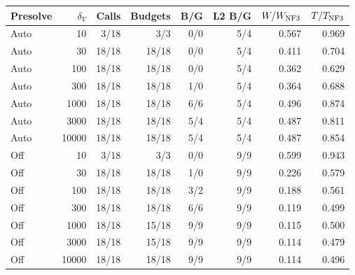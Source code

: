 \begin{tabular}{lrrrrrrr}
\toprule
Presolve & $\delta_V$ & Calls & Budgets & B/G & L2 B/G & $W/W_{\rm NF3}$ & $T/T_{\rm NF3}$\\
\midrule
Auto & 10 & 3/18 & 3/3 & 0/0 & 5/4 & 0.567 & 0.969\\
Auto & 30 & 18/18 & 18/18 & 0/0 & 5/4 & 0.411 & 0.704\\
Auto & 100 & 18/18 & 18/18 & 0/0 & 5/4 & 0.362 & 0.629\\
Auto & 300 & 18/18 & 18/18 & 1/0 & 5/4 & 0.364 & 0.688\\
Auto & 1000 & 18/18 & 18/18 & 6/6 & 5/4 & 0.496 & 0.874\\
Auto & 3000 & 18/18 & 18/18 & 5/4 & 5/4 & 0.487 & 0.811\\
Auto & 10000 & 18/18 & 18/18 & 5/4 & 5/4 & 0.487 & 0.854\\
Off & 10 & 3/18 & 3/3 & 0/0 & 9/9 & 0.599 & 0.943\\
Off & 30 & 18/18 & 18/18 & 1/0 & 9/9 & 0.226 & 0.579\\
Off & 100 & 18/18 & 18/18 & 3/2 & 9/9 & 0.188 & 0.561\\
Off & 300 & 18/18 & 18/18 & 6/6 & 9/9 & 0.119 & 0.499\\
Off & 1000 & 18/18 & 15/18 & 9/9 & 9/9 & 0.115 & 0.500\\
Off & 3000 & 18/18 & 15/18 & 9/9 & 9/9 & 0.114 & 0.479\\
Off & 10000 & 18/18 & 18/18 & 9/9 & 9/9 & 0.114 & 0.496\\
\bottomrule
\end{tabular}

